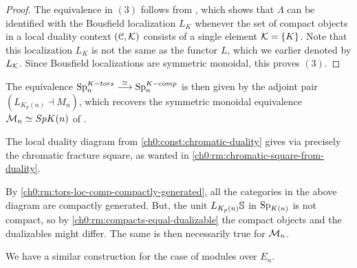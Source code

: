 \begin{proof}
    The equivalence in $(3)$ follows from \cite[2.34]{barthel-heard-valenzuela_2018}, which shows that $\Lambda$ can be identified with the Bousfield localization $L_K$ whenever the set of compact objects in a local duality context $(\C, \K)$ consists of a single element $\K=\{K\}$. Note that this localization $L_K$ is not the same as the functor $L$, which we earlier denoted by $L_\K$. Since Bousfield localizations are symmetric monoidal, this proves $(3)$. 
\end{proof}

\begin{remark}
    The equivalence $\sp\np^{K-tors}\overset{\simeq}\longrightarrow \sp\np^{K-comp}$ is then given by the adjoint pair $(L_{K_p(n)}\dashv M_n)$, which recovers the symmetric monoidal equivalence $\M\np \simeq Sp\Kn$ of \cite[6.19]{hovey-strickland_99}. 
\end{remark}

\begin{remark}
    The local duality diagram from \cref{ch0:const:chromatic-duality} gives via \cite[2.26]{barthel-heard-valenzuela_2018} precisely the chromatic fracture square, as wanted in \cref{ch0:rm:chromatic-square-from-duality}.   
\end{remark}

\begin{remark}
    By \cref{ch0:rm:tors-loc-comp-compactly-generated}, all the categories in the above diagram are compactly generated. But, the unit $L_{K_p(n)}\S$ in $\SpK$ is not compact, so by \cref{ch0:rm:compacts-equal-dualizable} the compact objects and the dualizables might differ. The same is then necessarily true for $\M\np$.
\end{remark}

We have a similar construction for the case of modules over $E_n$. 

